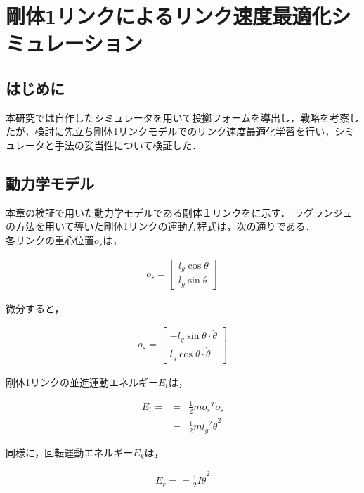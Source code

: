 \chapter[剛体1リンクのリンク速度最適化シミュレーション]{剛体1リンクによるリンク速度最適化シミュレーション}

\section{はじめに}
本研究では自作したシミュレータを用いて投擲フォームを導出し，戦略を考察したが，検討に先立ち剛体1リンクモデルでのリンク速度最適化学習を行い，シミュレータと手法の妥当性について検証した．
\section{動力学モデル}
本章の検証で用いた動力学モデルである剛体１リンクをに示す．
ラグランジュの方法を用いて導いた剛体1リンクの運動方程式は，次の通りである．\\
各リンクの重心位置$o_{s}$は，

\begin{eqnarray}
  o_{s} = 
              \begin{bmatrix}
              l_{g}\cos\theta\\
              l_{g}\sin\theta
              \end{bmatrix}
\end{eqnarray}

微分すると，

\begin{eqnarray}
  o_{\dot{s}} = 
              \begin{bmatrix}
              -l_{g}\sin\theta \cdot \dot{\theta}\\
              l_{g}\cos\theta \cdot \dot{\theta}
              \end{bmatrix}
\end{eqnarray}

剛体1リンクの並進運動エネルギー$E_{t}$は，

\begin{eqnarray}
  E_{t} =
  &=&\frac{1}{2}mo_{\dot{s}}{}^T\!o_{\dot{s}} \nonumber \\
  &=&\frac{1}{2}m{l_{g}}^2{\dot{\theta}}^2
\end{eqnarray}

同様に，回転運動エネルギー$E_{k}$は，

\begin{eqnarray}
  E_{r} =
  =\frac{1}{2}I{\dot{\theta}}^2
\end{eqnarray}


